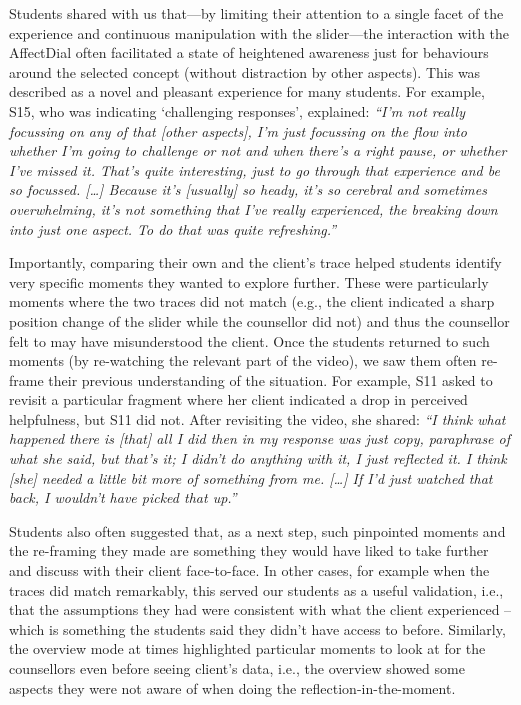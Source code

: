 \documentclass{sigchi}
\newcommand{\qq}[2]{\textrm{\textit{``#2''}}}
\begin{document}
Students shared with us that---by limiting their attention to a single facet of the experience and continuous manipulation with the slider---the interaction with the AffectDial often facilitated a state of heightened awareness just for behaviours around the selected concept (without distraction by other aspects). This was described as a novel and pleasant experience for many students. For example, S15, who was indicating `challenging responses', explained: \qq{Ben}{I'm not really focussing on any of that [other aspects], I'm just focussing on the flow into whether I'm going to challenge or not and when there's a right pause, or whether I've missed it. That's quite interesting, just to go through that experience and be so focussed. [\dots] Because it's [usually] so heady, it's so cerebral and sometimes overwhelming, it's not something that I've really experienced, the breaking down into just one aspect. To do that was quite refreshing.}

Importantly, comparing their own and the client's trace helped students identify very specific moments they wanted to explore further. These were particularly moments where the two traces did not match (e.g., the client indicated a sharp position change of the slider while the counsellor did not) and thus the counsellor felt to may have misunderstood the client. Once the students returned to such moments (by re-watching the relevant part of the video), we saw them often re-frame their previous understanding of the situation. For example, S11 asked to revisit a particular fragment where her client indicated a drop in perceived helpfulness, but S11 did not. After revisiting the video, she shared: \qq{Carolyn}{I think what happened there is [that] all I did then in my response was just copy, paraphrase of what she said, but that's it; I didn't do anything with it, I just reflected it. I think [she] needed a little bit more of something from me. [\dots] If I'd just watched that back, I wouldn't have picked that up.} 

Students also often suggested that, as a next step, such pinpointed moments and the re-framing they made are something they would have liked to take further and discuss with their client face-to-face. In other cases, for example when the traces did match remarkably, this served our students as a useful validation, i.e., that the assumptions they had were consistent with what the client experienced -- which is something the students said they didn't have access to before. Similarly, the overview mode at times highlighted particular moments to look at for the counsellors even before seeing client's data, i.e., the overview showed some aspects they were not aware of when doing the reflection-in-the-moment.
\end{document}
